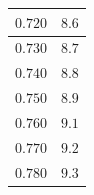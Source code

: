 \documentclass[letterpaper, 12pt]{article}
\begin{document}
\begin{longtable}{|c|c|}
    \hline
    $0.720$                                                                                                                                                                     & $8.6$                                                                                                                                                                                  \\
    \hline
    $0.730$                                                                                                                                                                     & $8.7$                                                                                                                                                                                  \\
    \hline
    $0.740$                                                                                                                                                                     & $8.8$                                                                                                                                                                                  \\
    \hline
    $0.750$                                                                                                                                                                     & $8.9$                                                                                                                                                                                  \\
    \hline
    $0.760$                                                                                                                                                                     & $9.1$                                                                                                                                                                                  \\
    \hline
    $0.770$                                                                                                                                                                     & $9.2$                                                                                                                                                                                  \\
    \hline
    $0.780$                                                                                                                                                                     & $9.3$                                                                                                                                                                                  \\

\end{longtable}
\end{document}
